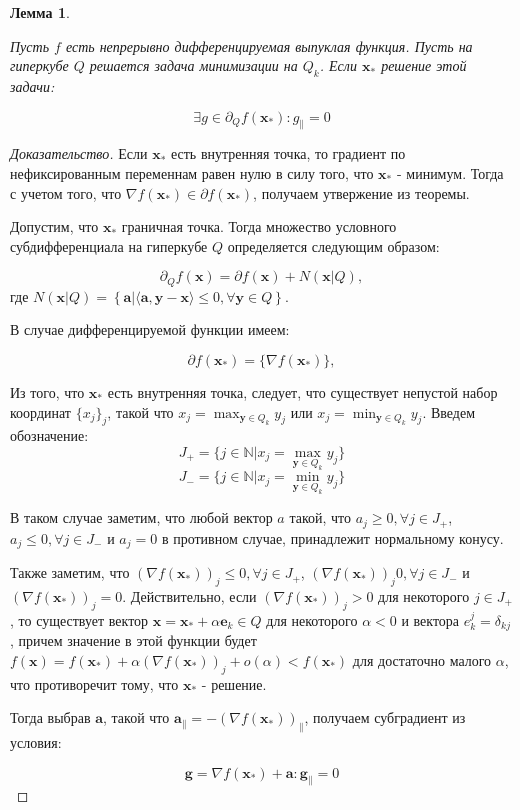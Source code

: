 \documentclass[12pt]{article}
\newtheorem{lemma}{Лемма}[section]
\begin{document}
\begin{lemma}
\label{subgradient}

Пусть $f$ есть непрерывно дифференцируемая выпуклая функция. Пусть на гиперкубе $Q$ решается задача минимизации на $Q_k$. Если $\textbf{x}_*$ решение этой задачи:

$$\exists g \in \partial_Q f(\textbf{x}_*) : g_\parallel = 0$$
\end{lemma}
\begin{proof}[Доказательство]
Если $\textbf{x}_*$ есть внутренняя точка, то градиент по нефиксированным переменнам равен нулю в силу того, что $\textbf{x}_*$ - минимум. Тогда с учетом того, что $\nabla f(\textbf{x}_*)\in\partial f(\textbf{x}_*)$, получаем утвержение из теоремы.

Допустим, что $\textbf{x}_*$ граничная точка. Тогда множество условного субдифференциала на гиперкубе $Q$ определяется следующим образом:

$$\partial_Q f(\textbf{x}) = \partial f(\textbf{x}) + N\left(\textbf{x}|Q\right),$$
где $N(\textbf{x}|Q) = \left\{\textbf{a}|\langle\textbf{a}, \textbf{y} - \textbf{x}\rangle\leq 0, \forall \textbf{y} \in Q\right\}$. 

В случае дифференцируемой функции имеем:

$$\partial f(\textbf{x}_*) = \{\nabla f(\textbf{x}_*)\},$$

Из того, что $\textbf{x}_*$ есть внутренняя точка, следует, что существует непустой набор координат $\{x_j\}_j$, такой что $x_j = \max_{\textbf{y}\in Q_k}y_j$ или $x_j = \min_{\textbf{y}\in Q_k}y_j$. Введем обозначение:
$$J_+=\{j\in \mathbb{N}| x_j = \max_{\textbf{y}\in Q_k}y_j\}$$
$$J_-=\{j\in \mathbb{N}| x_j = \min_{\textbf{y}\in Q_k}y_j\}$$

В таком случае заметим, что любой вектор $a$ такой, что $a_j \geq 0, \forall j \in J_+$, $a_j \leq 0, \forall j \in J_-$ и $a_j=0$ в противном случае, принадлежит нормальному конусу.

Также заметим, что $(\nabla f(\textbf{x}_*))_j \leq 0, \forall j \in J_+$, $(\nabla f(\textbf{x}_*))_j  0, \forall j \in J_-$ и $(\nabla f(\textbf{x}_*))_j=0$. Действительно, если $(\nabla f(\textbf{x}_*))_j > 0$ для некоторого $j\in J_+$, то существует вектор $\textbf{x}=\textbf{x}_* + \alpha \textbf{e}_k \in Q$ для некоторого $\alpha<0$ и вектора $e_k^j = \delta_{kj}$, причем значение в этой функции будет $f(\textbf{x}) = f(\textbf{x}_*) + \alpha (\nabla f(\textbf{x}_*))_j + o(\alpha)  < f(\textbf{x}_*)$ для достаточно малого $\alpha$, что противоречит тому, что $\textbf{x}_*$ - решение.

Тогда выбрав $\textbf{a}$, такой что $\textbf{a}_\parallel = -\left(\nabla f(\textbf{x}_*)\right)_\parallel$, получаем субградиент из условия:

$$\textbf{g} = \nabla f(\textbf{x}_*) + \textbf{a} : \textbf{g}_\parallel =0$$
\end{proof}
\end{document}
